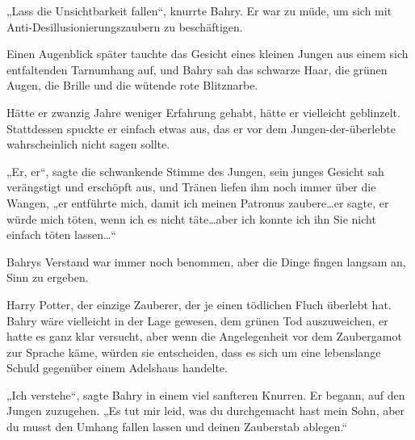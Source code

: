 „Lass die Unsichtbarkeit fallen“, knurrte Bahry. Er war zu müde, um sich mit Anti-Desillusionierungszaubern zu beschäftigen.

Einen Augenblick später tauchte das Gesicht eines kleinen Jungen aus einem sich entfaltenden Tarnumhang auf, und Bahry sah das schwarze Haar, die grünen Augen, die Brille und die wütende rote Blitznarbe.

Hätte er zwanzig Jahre weniger Erfahrung gehabt, hätte er vielleicht geblinzelt. Stattdessen spuckte er einfach etwas aus, das er vor dem Jungen-der-überlebte wahrscheinlich nicht sagen sollte.

„Er, er“, sagte die schwankende Stimme des Jungen, sein junges Gesicht sah verängstigt und erschöpft aus, und Tränen liefen ihm noch immer über die Wangen, „er entführte mich, damit ich meinen Patronus zaubere…er sagte, er würde mich töten, wenn ich es nicht täte…aber ich konnte ich ihn Sie nicht einfach töten lassen…“

Bahrys Verstand war immer noch benommen, aber die Dinge fingen langsam an, Sinn zu ergeben.

Harry Potter, der einzige Zauberer, der je einen tödlichen Fluch überlebt hat. Bahry wäre vielleicht in der Lage gewesen, dem grünen Tod auszuweichen, er hatte es ganz klar versucht, aber wenn die Angelegenheit vor dem Zaubergamot zur Sprache käme, würden sie entscheiden, dass es sich um eine lebenslange Schuld gegenüber einem Adelshaus handelte.

„Ich verstehe“, sagte Bahry in einem viel sanfteren Knurren. Er begann, auf den Jungen zuzugehen. „Es tut mir leid, was du durchgemacht hast mein Sohn, aber du musst den Umhang fallen lassen und deinen Zauberstab ablegen.“

